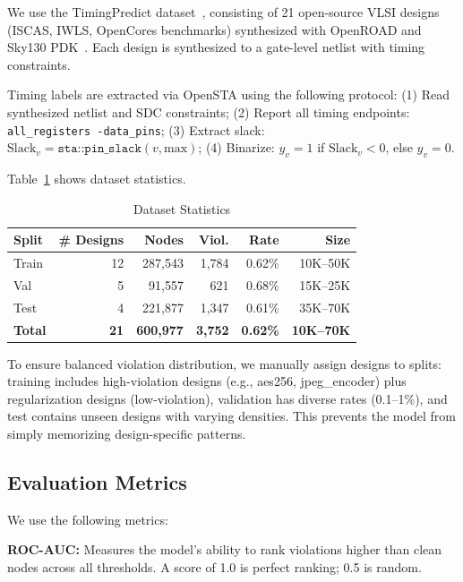 We use the TimingPredict dataset~\cite{guo2022timingpredict}, consisting of 21 open-source VLSI designs (ISCAS, IWLS, OpenCores benchmarks) synthesized with OpenROAD and Sky130 PDK~\cite{sky130pdk}. Each design is synthesized to a gate-level netlist with timing constraints.

Timing labels are extracted via OpenSTA using the following protocol:
(1) Read synthesized netlist and SDC constraints;
(2) Report all timing endpoints: \texttt{all\_registers -data\_pins};
(3) Extract slack: $\text{Slack}_v = \texttt{sta::pin\_slack}(v, \text{max})$;
(4) Binarize: $y_v = 1$ if $\text{Slack}_v < 0$, else $y_v = 0$.

Table~\ref{tab:dataset} shows dataset statistics.

\begin{table}[t]
\centering
\caption{Dataset Statistics}
\label{tab:dataset}
\begin{tabular}{@{}lrrrrr@{}}
\toprule
\textbf{Split} & \textbf{\# Designs} & \textbf{Nodes} & \textbf{Viol.} & \textbf{Rate} & \textbf{Size} \\
\midrule
Train & 12 & 287,543 & 1,784 & 0.62\% & 10K--50K \\
Val & 5 & 91,557 & 621 & 0.68\% & 15K--25K \\
Test & 4 & 221,877 & 1,347 & 0.61\% & 35K--70K \\
\midrule
\textbf{Total} & \textbf{21} & \textbf{600,977} & \textbf{3,752} & \textbf{0.62\%} & \textbf{10K--70K} \\
\bottomrule
\end{tabular}
\end{table}

To ensure balanced violation distribution, we manually assign designs to splits: training includes high-violation designs (e.g., aes256, jpeg\_encoder) plus regularization designs (low-violation), validation has diverse rates (0.1--1\%), and test contains unseen designs with varying densities. This prevents the model from simply memorizing design-specific patterns.

\subsection{Evaluation Metrics}

We use the following metrics:

\textbf{ROC-AUC:} Measures the model's ability to rank violations higher than clean nodes across all thresholds. A score of 1.0 is perfect ranking; 0.5 is random.

